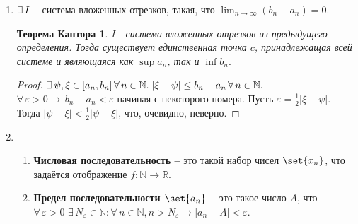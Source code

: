 \documentclass{article}
\theoremstyle{plain}
\def\letus{%
    \mathord{\setbox0=\hbox{$\exists$}%
             \hbox{\kern 0.125\wd0%
                   \vbox to \ht0{%
                      \hrule width 0.75\wd0%
                      \vfill%
                      \hrule width 0.75\wd0}%
                   \vrule height \ht0%
                   \kern 0.125\wd0}%
           }%
}
\begin{document}
\begin{enumerate}
\begin{enumerate}
        \textbf{Система вложенных отрезков I} -- это такой набор отрезков $[a_{1}, b_{1}], [a_{2}, b_{2}] \cdots$, каждый из которых является подмножеством предыдущего: $[a_{n}, b_{n}]\,$ $\subset \,$ $[a_{n - 1}, b_{n - 1}]\,$ $\subset \, \cdots \subset [a_{1}, b_{1}]$
        \item \newtheorem*{theorem3*}{Теорема о существовании хотя бы одной общей точки у системы вложенных отрезков I}
        \begin{theorem3*}
        В любой системе вложенных отрезков существует хотя бы одна такая точка $c,$ которая принадлежит всем отрезкам системы.
        \end{theorem3*}
        \begin{proof}
            $\letus{}\, [a_{n}, b_{n}]\, \subset\, \cdots \, \subset [a_{1}, b_{1}]$. Тогда пусть $\set{a_{n}}, \set{b_{m}}$ -- множества левых концов системы. Тогда $\forall\,n, m \rightarrow a_{n} \le b_{m}$
            В силу аксиомы непрерывности $\exists\, c: \forall n, m \rightarrow a_{n} \le c \le b{m}$.
            При $m = n$ мы имеем, что $\forall n \rightarrow a_{n} \le c \le b_{n}\implies c\,- $ общая точка системы.
        \end{proof}
    \end{enumerate}
    \item $\letus{}\, I\, $ - система вложенных отрезков, такая, что $\lim_{n \to \infty}{(b_{n} - a_{n})} = 0$.
    \newtheorem*{theorem4*}{Теорема Кантора}
    \begin{theorem4*}
    I - система вложенных отрезков из предыдущего определения. Тогда существует единственная точка $c$, принадлежащая всей системе и являющаяся как $\sup{{a_{n}}}$, так и $\inf{{b_{n}}}.$
    \end{theorem4*}
    \begin{proof}
    $\letus\, \psi, \xi \in [a_{n}, b_{n}]\,\forall \, n \in \mathbb{N}.\; |\xi - \psi| \le b_{n} - a_{n}\, \forall\, n\in\mathbb{N}.\, $ $\forall\,\varepsilon > 0\rightarrow\,b_{n} - a_{n} < \varepsilon$ начиная с некоторого номера. Пусть $\varepsilon = \frac{1}{2}|\xi - \psi|.$ Тогда $|\psi - \xi| < \frac{1}{2}|\psi - \xi|$, что, очевидно, неверно.  
    \end{proof}
    \item \begin{enumerate}
        \item \textbf{Числовая последовательность -- } это такой набор чисел $\set{{x_{n}}}$, что задаётся отображение $f: \mathbb{N} \to \mathbb{R}$. 
        \item \textbf{Предел последовательности $\set{{a_{n}}}$ -- } это такое число $A$, что $\forall\,\varepsilon > 0\,\, \exists\,N_{\varepsilon}\in \mathbb{N}: \forall\, n \in \mathbb{N}, n > N_{\varepsilon} \rightarrow |a_{n} - A| < \varepsilon$.

\end{enumerate}
\end{enumerate}
\end{document}
